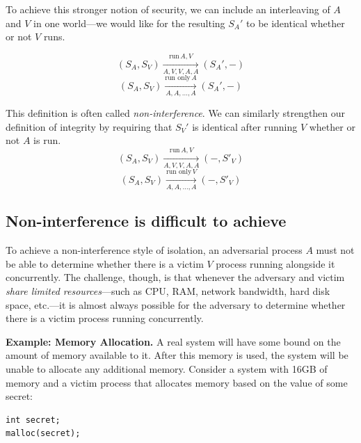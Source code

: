 \documentclass[
  letterpaper,
]{scrbook}
\theoremstyle{definition}
\theoremstyle{plain}
\theoremstyle{plain}
\theoremstyle{remark}
\begin{document}
To achieve this stronger notion of security, we can include an
interleaving of \(A\) and \(V\) in one world---we would like for the
resulting \(S_A'\) to be identical whether or not \(V\) runs.

\[ (S_A, S_V) \xrightarrow[A, V, V, A, A]{\text{run}\, A, V} (S_A', -) \]
\[ (S_A, S_V) \xrightarrow[A, A, \ldots, A]{\text{run only}\, A} (S_A', -) \]

This definition is often called \emph{non-interference}. We can
similarly strengthen our definition of integrity by requiring that
\(S_V'\) is identical after running \(V\) whether or not \(A\) is run.
\[ (S_A, S_V) \xrightarrow[A, V, V, A, A]{\text{run}\, A, V} (-, S'_V) \]
\[ (S_A, S_V) \xrightarrow[A, A, \ldots, A]{\text{run only}\, V} (-, S'_V) \]

\subsection{Non-interference is difficult to
achieve}\label{non-interference-is-difficult-to-achieve}

To achieve a non-interference style of isolation, an adversarial process
\(A\) must not be able to determine whether there is a victim \(V\)
process running alongside it concurrently. The challenge, though, is
that whenever the adversary and victim \emph{share limited
resources}---such as CPU, RAM, network bandwidth, hard disk space,
etc.---it is almost always possible for the adversary to determine
whether there is a victim process running concurrently.


\textbf{Example: Memory Allocation.} A real system will have some bound
on the amount of memory available to it. After this memory is used, the
system will be unable to allocate any additional memory. Consider a
system with 16GB of memory and a victim process that allocates memory
based on the value of some secret:

\begin{verbatim}
int secret;
malloc(secret);
\end{verbatim}
\end{document}
